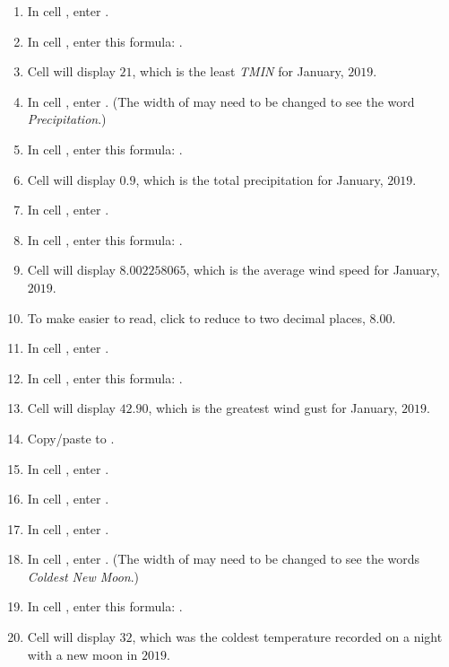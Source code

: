 \begin{enumerate}[resume]
	\item In cell , enter .
	\item In cell , enter this formula: .
	\item Cell  will display $ 21 $, which is the least \textit{TMIN} for January, $ 2019 $.

	\item In cell , enter .  (The width of  may need to be changed to see the word \textit{Precipitation}.)
	\item In cell , enter this formula: .
	\item Cell  will display $ 0.9 $, which is the total precipitation for January, $ 2019 $.

	\item In cell , enter .
	\item In cell , enter this formula: .
	\item Cell  will display $ 8.002258065 $, which is the average wind speed for January, $ 2019 $.
	\item To make  easier to read, click  to reduce  to two decimal places, $ 8.00 $.

	\item In cell , enter .
	\item In cell , enter this formula: .
	\item Cell  will display $ 42.90 $, which is the greatest wind gust for January, $ 2019 $.

	\item Copy/paste  to .
	\item In cell , enter .
	\item In cell , enter .
	\item In cell , enter .
	\item In cell , enter . (The width of  may need to be changed to see the words \textit{Coldest New Moon}.)
	\item In cell , enter this formula: .
	\item Cell  will display $ 32 $, which was the coldest temperature recorded on a night with a new moon in $ 2019 $.


\end{enumerate}
